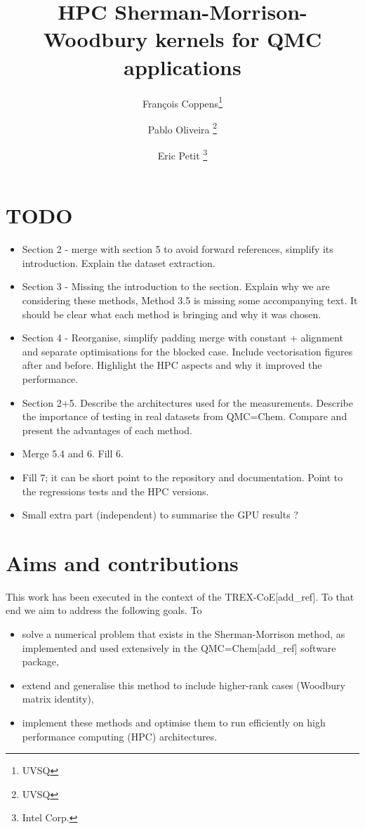 \documentclass[11pt]{article}
\title{HPC Sherman-Morrison-Woodbury kernels for QMC applications}
\author{Fran\c{c}ois Coppens\thanks{UVSQ} \and Pablo Oliveira \thanks{UVSQ} \and Eric Petit \thanks{Intel Corp.}}
\numberwithin{figure}{section}
\numberwithin{table}{section}
\begin{document}
	\maketitle
	\tableofcontents
	
  \section*{TODO}
    \begin{itemize}           
      \item Section 2 - merge with section 5 to avoid forward references, simplify its introduction. Explain the dataset extraction.
      \item Section 3 - Missing the introduction to the section. Explain why we are considering these methods, Method 3.5 is missing some accompanying text. It should be clear what each method is bringing and why it was chosen.
      \item Section 4 - Reorganise, simplify padding merge with constant + alignment and separate optimisations for the blocked case. Include vectorisation figures after and before.
      Highlight the HPC aspects and why it improved the performance. 
      \item Section 2+5. Describe the architectures used for the measurements. Describe the importance of testing in real datasets from QMC=Chem. Compare and present the advantages of each method.
      \item Merge 5.4 and 6. Fill 6.
      \item Fill 7; it can be short point to the repository and documentation. Point to the regressions tests and the HPC versions.
      \item Small extra part (independent) to summarise the GPU results ?
    \end{itemize}
    
  \newpage
  \section{Aims and contributions}      
    This work has been executed in the context of the TREX-CoE[add\_ref]. To that end we aim to address the following goals. To
    \begin{itemize}
      \item solve a numerical problem that exists in the Sherman-Morrison method, as implemented and used extensively in the QMC=Chem[add\_ref] software package,
      \item extend and generalise this method to include higher-rank cases (Woodbury matrix identity),
      \item implement these methods and optimise them to run efficiently on high performance computing (HPC) architectures.
    \end{itemize}
      
\end{document}
